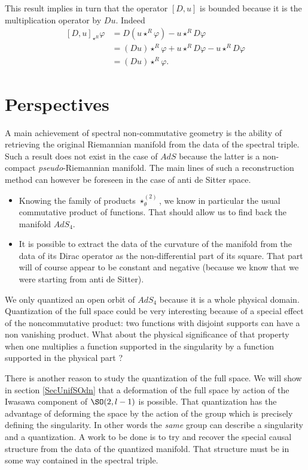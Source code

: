 This result implies in turn that the operator $[D,u]$ is bounded because it is the multiplication operator by $Du$. Indeed
\[ 
\begin{split}
  [D,u]_{\star^R}\varphi
        &=D(u\star^R \varphi)-u\star^R D\varphi\\
        &= (Du)\star^R\varphi+u\star^R D\varphi-u\star^R D\varphi\\
        &=(Du)\star^R\varphi.
\end{split}  
\]

\section{Perspectives}

A main achievement of spectral non-commutative geometry is the ability of retrieving the original Riemannian manifold from the data of the spectral triple. Such a result does not exist in the case of $AdS$ because the latter is a non-compact \emph{pseudo}-Riemannian manifold. The main lines of such a reconstruction method can however be foreseen in the case of anti de Sitter space.
\begin{itemize}
\item Knowing the family of products $\star^{(2)}_{\theta}$, we know in particular the usual commutative product of functions. That should allow us to find back the manifold $AdS_4$.
\item It is possible to extract the data of the curvature of the manifold from the data of its Dirac operator as the non-differential part of its square. That part will of course appear to be constant and negative (because we know that we were starting from anti de Sitter).
\end{itemize}

We only quantized an open orbit of $AdS_4$ because it is a whole physical domain. Quantization of the full space could be very interesting because of a special effect of the noncommutative product: two functions with disjoint supports can have a non vanishing product. What about the physical significance of that property when one multiplies a function supported in the singularity by a function supported in the physical part ?

There is another reason to study the quantization of the full space. We will show in section \ref{SecUnifSOdn} that a deformation of the full space by action of the Iwasawa component of $\SO(2,l-1)$ is possible. That quantization has the advantage of deforming the space by the action of the group which is precisely defining the singularity. In other words the \emph{same} group can describe a singularity and a quantization. A work to be done is to try and recover the special causal structure from the data of the quantized manifold. That structure must be in some way contained in the spectral triple. 


